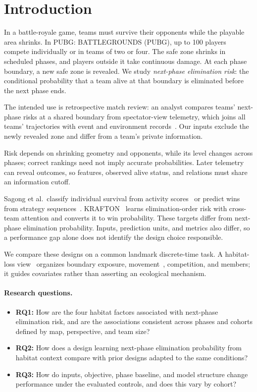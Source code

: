 \documentclass[sigconf,anonymous,nonacm]{acmart}
\begin{document}
\section{Introduction}
\label{sec:introduction}
In a battle-royale game, teams must survive their opponents while the playable area shrinks. In PUBG: BATTLEGROUNDS (PUBG), up to 100 players compete individually or in teams of two or four. The safe zone shrinks in scheduled phases, and players outside it take continuous damage. At each phase boundary, a new safe zone is revealed. We study \emph{next-phase elimination risk}: the conditional probability that a team alive at that boundary is eliminated before the next phase ends.

The intended use is retrospective match review: an analyst compares teams' next-phase risks at a shared boundary from spectator-view telemetry, which joins all teams' trajectories with event and environment records~\cite{PUBGAPI,Zheng15}. Our inputs exclude the newly revealed zone and differ from a team's private information.

Risk depends on shrinking geometry and opponents, while its level changes across phases; correct rankings need not imply accurate probabilities. Later telemetry can reveal outcomes, so features, observed alive status, and relations must share an information cutoff.

Sagong et al.\ classify individual survival from activity scores~\cite{Sagong25a} or predict wins from strategy sequences~\cite{Sagong25b}. KRAFTON~\cite{KRAFTON} learns elimination-order risk with cross-team attention and converts it to win probability. These targets differ from next-phase elimination probability. Inputs, prediction units, and metrics also differ, so a performance gap alone does not identify the design choice responsible.

We compare these designs on a common landmark discrete-time task. A habitat-loss view~\cite{Fahrig03} organizes boundary exposure, movement~\cite{Nathan08}, competition, and members; it guides covariates rather than asserting an ecological mechanism.

\paragraph{Research questions.}
\begin{itemize}
\item \textbf{RQ1:} How are the four habitat factors associated with next-phase elimination risk, and are the associations consistent across phases and cohorts defined by map, perspective, and team size?
\item \textbf{RQ2:} How does a design learning next-phase elimination probability from habitat context compare with prior designs adapted to the same conditions?
\item \textbf{RQ3:} How do inputs, objective, phase baseline, and model structure change performance under the evaluated controls, and does this vary by cohort?
\end{itemize}
\end{document}
